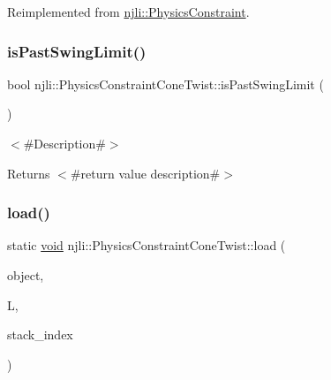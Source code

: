 Reimplemented from \mbox{\hyperlink{classnjli_1_1_physics_constraint_a3234aefaf2706165fbc52b5b37c05888}{njli\+::\+Physics\+Constraint}}.

\mbox{\label{classnjli_1_1_physics_constraint_cone_twist_aa88ef9a706160dba1e9805171bfcbd43}} 
\subsubsection{\texorpdfstring{is\+Past\+Swing\+Limit()}{isPastSwingLimit()}}
{\footnotesize\ttfamily bool njli\+::\+Physics\+Constraint\+Cone\+Twist\+::is\+Past\+Swing\+Limit (\begin{DoxyParamCaption}{ }\end{DoxyParamCaption})}

$<$\#\+Description\#$>$

\begin{DoxyReturn}{Returns}
$<$\#return value description\#$>$ 
\end{DoxyReturn}
\mbox{\label{classnjli_1_1_physics_constraint_cone_twist_a3174e2995c524ac300bed364e4816080}} 
\subsubsection{\texorpdfstring{load()}{load()}}
{\footnotesize\ttfamily static \mbox{\hyperlink{_thread_8h_af1e856da2e658414cb2456cb6f7ebc66}{void}} njli\+::\+Physics\+Constraint\+Cone\+Twist\+::load (\begin{DoxyParamCaption}\item[{\mbox{\hyperlink{classnjli_1_1_physics_constraint_cone_twist}{Physics\+Constraint\+Cone\+Twist}} \&}]{object,  }\item[{lua\+\_\+\+State $\ast$}]{L,  }\item[{int}]{stack\+\_\+index }\end{DoxyParamCaption})\hspace{0.3cm}{\ttfamily [static]}}

